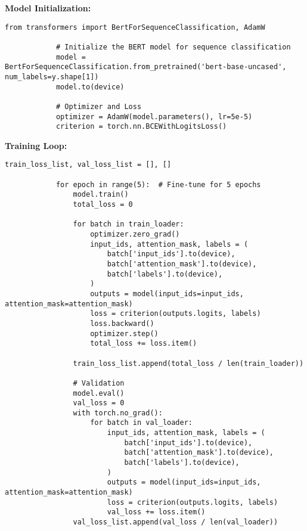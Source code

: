         \textbf{Model Initialization:}
        
        \vspace{0.5em}

        \begin{lstlisting}[caption={Initialize BERT model for sequence classification}, label={lst:bert_model}]
            from transformers import BertForSequenceClassification, AdamW

            # Initialize the BERT model for sequence classification
            model = BertForSequenceClassification.from_pretrained('bert-base-uncased', num_labels=y.shape[1])
            model.to(device)

            # Optimizer and Loss
            optimizer = AdamW(model.parameters(), lr=5e-5)
            criterion = torch.nn.BCEWithLogitsLoss()
        \end{lstlisting}

        \textbf{Training Loop:}
        
        \vspace{0.5em}

        \begin{lstlisting}[caption={Fine-tune BERT model}, label={lst:bert_fine_tune}]
            train_loss_list, val_loss_list = [], []

            for epoch in range(5):  # Fine-tune for 5 epochs
                model.train()
                total_loss = 0

                for batch in train_loader:
                    optimizer.zero_grad()
                    input_ids, attention_mask, labels = (
                        batch['input_ids'].to(device),
                        batch['attention_mask'].to(device),
                        batch['labels'].to(device),
                    )
                    outputs = model(input_ids=input_ids, attention_mask=attention_mask)
                    loss = criterion(outputs.logits, labels)
                    loss.backward()
                    optimizer.step()
                    total_loss += loss.item()

                train_loss_list.append(total_loss / len(train_loader))

                # Validation
                model.eval()
                val_loss = 0
                with torch.no_grad():
                    for batch in val_loader:
                        input_ids, attention_mask, labels = (
                            batch['input_ids'].to(device),
                            batch['attention_mask'].to(device),
                            batch['labels'].to(device),
                        )
                        outputs = model(input_ids=input_ids, attention_mask=attention_mask)
                        loss = criterion(outputs.logits, labels)
                        val_loss += loss.item()
                val_loss_list.append(val_loss / len(val_loader))
        \end{lstlisting}


